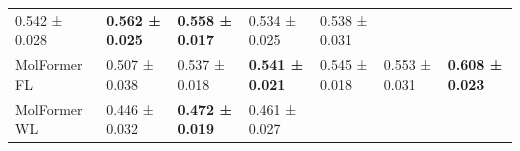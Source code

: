 \documentclass[
  10pt,
]{article}
\begin{document}
\begin{longtable}[]{@{}lllllll@{}}
\begin{minipage}[t]{0.12\columnwidth}
0.542 ± 0.028\strut
\end{minipage} & \begin{minipage}[t]{0.12\columnwidth}\raggedright
\textbf{0.562 ± 0.025}\strut
\end{minipage} & \begin{minipage}[t]{0.12\columnwidth}\raggedright
\textbf{0.558 ± 0.017}\strut
\end{minipage} & \begin{minipage}[t]{0.12\columnwidth}\raggedright
0.534 ± 0.025\strut
\end{minipage} & \begin{minipage}[t]{0.12\columnwidth}\raggedright
0.538 ± 0.031\strut
\end{minipage}\tabularnewline
\begin{minipage}[t]{0.12\columnwidth}\raggedright
MolFormer FL\strut
\end{minipage} & \begin{minipage}[t]{0.12\columnwidth}\raggedright
0.507 ± 0.038\strut
\end{minipage} & \begin{minipage}[t]{0.12\columnwidth}\raggedright
0.537 ± 0.018\strut
\end{minipage} & \begin{minipage}[t]{0.12\columnwidth}\raggedright
\textbf{0.541 ± 0.021}\strut
\end{minipage} & \begin{minipage}[t]{0.12\columnwidth}\raggedright
0.545 ± 0.018\strut
\end{minipage} & \begin{minipage}[t]{0.12\columnwidth}\raggedright
0.553 ± 0.031\strut
\end{minipage} & \begin{minipage}[t]{0.12\columnwidth}\raggedright
\textbf{0.608 ± 0.023}\strut
\end{minipage}\tabularnewline
\begin{minipage}[t]{0.12\columnwidth}\raggedright
MolFormer WL\strut
\end{minipage} & \begin{minipage}[t]{0.12\columnwidth}\raggedright
0.446 ± 0.032\strut
\end{minipage} & \begin{minipage}[t]{0.12\columnwidth}\raggedright
\textbf{0.472 ± 0.019}\strut
\end{minipage} & \begin{minipage}[t]{0.12\columnwidth}\raggedright
0.461 ± 0.027\strut
\end{minipage} & \begin{minipage}[t]{0.12\columnwidth}\raggedright

\end{minipage}
\end{longtable}
\end{document}
